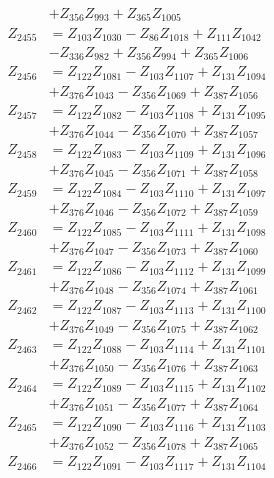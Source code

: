 \begin{multicols}{2}
\begin{align}
&+ Z_{356}Z_{993} + Z_{365}Z_{1005} \nonumber \\
Z_{2455} &= Z_{103}Z_{1030} - Z_{86}Z_{1018} + Z_{111}Z_{1042}  \nonumber \\
&- Z_{336}Z_{982} + Z_{356}Z_{994} + Z_{365}Z_{1006} \nonumber \\
Z_{2456} &= Z_{122}Z_{1081} - Z_{103}Z_{1107} + Z_{131}Z_{1094}  \nonumber \\
&+ Z_{376}Z_{1043} - Z_{356}Z_{1069} + Z_{387}Z_{1056} \nonumber \\
Z_{2457} &= Z_{122}Z_{1082} - Z_{103}Z_{1108} + Z_{131}Z_{1095}  \nonumber \\
&+ Z_{376}Z_{1044} - Z_{356}Z_{1070} + Z_{387}Z_{1057} \nonumber \\
Z_{2458} &= Z_{122}Z_{1083} - Z_{103}Z_{1109} + Z_{131}Z_{1096}  \nonumber \\
&+ Z_{376}Z_{1045} - Z_{356}Z_{1071} + Z_{387}Z_{1058} \nonumber \\
Z_{2459} &= Z_{122}Z_{1084} - Z_{103}Z_{1110} + Z_{131}Z_{1097}  \nonumber \\
&+ Z_{376}Z_{1046} - Z_{356}Z_{1072} + Z_{387}Z_{1059} \nonumber \\
Z_{2460} &= Z_{122}Z_{1085} - Z_{103}Z_{1111} + Z_{131}Z_{1098}  \nonumber \\
&+ Z_{376}Z_{1047} - Z_{356}Z_{1073} + Z_{387}Z_{1060} \nonumber \\
Z_{2461} &= Z_{122}Z_{1086} - Z_{103}Z_{1112} + Z_{131}Z_{1099}  \nonumber \\
&+ Z_{376}Z_{1048} - Z_{356}Z_{1074} + Z_{387}Z_{1061} \nonumber \\
Z_{2462} &= Z_{122}Z_{1087} - Z_{103}Z_{1113} + Z_{131}Z_{1100}  \nonumber \\
&+ Z_{376}Z_{1049} - Z_{356}Z_{1075} + Z_{387}Z_{1062} \nonumber \\
Z_{2463} &= Z_{122}Z_{1088} - Z_{103}Z_{1114} + Z_{131}Z_{1101}  \nonumber \\
&+ Z_{376}Z_{1050} - Z_{356}Z_{1076} + Z_{387}Z_{1063} \nonumber \\
Z_{2464} &= Z_{122}Z_{1089} - Z_{103}Z_{1115} + Z_{131}Z_{1102}  \nonumber \\
&+ Z_{376}Z_{1051} - Z_{356}Z_{1077} + Z_{387}Z_{1064} \nonumber \\
Z_{2465} &= Z_{122}Z_{1090} - Z_{103}Z_{1116} + Z_{131}Z_{1103}  \nonumber \\
&+ Z_{376}Z_{1052} - Z_{356}Z_{1078} + Z_{387}Z_{1065} \nonumber \\
Z_{2466} &= Z_{122}Z_{1091} - Z_{103}Z_{1117} + Z_{131}Z_{1104}  \nonumber \\

\end{align}
\end{multicols}
